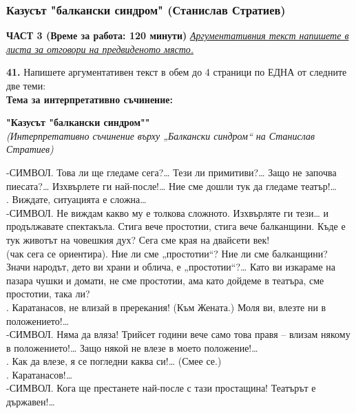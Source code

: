 \documentclass[12pt,a4paper]{article}
\begin{document}
\subsubsection{Казусът "балкански синдром" (Станислав Стратиев)}
\vspace{0.5cm}
\begin{center}
\textbf{ЧАСТ 3 (Време за работа: 120 минути)}
\vspace{0.2cm}
{\textit{\underline{Аргументативния текст напишете в листа за отговори на предвиденото място.}}}
\vspace{0.1cm}
\end{center}
\textbf{41.} Напишете аргументативен текст в обем до 4 страници по ЕДНА от следните две теми:
\\
\vspace{0.2cm}
\textbf{Тема за интерпретативно съчинение:}
\vspace{0.1cm}
\begin{center}
\textbf{"Казусът "балкански синдром""}
\\
\textit{(Интерпретативно съчинение върху „Балкански синдром“ на Станислав Стратиев)}
\end{center}
-СИМВОЛ. Това ли ще гледаме сега?… Тези ли примитиви?… Защо не започва пиесата?… Изхвърлете ги най-после!… Ние сме дошли тук да гледаме театър!…
\\
. Виждате, ситуацията е сложна…
\\
-СИМВОЛ. Не виждам какво му е толкова сложното. Изхвърляте ги тези… и продължавате спектакъла. Стига вече простотии, стига вече балканщини. Къде е тук животът на човешкия дух? Сега сме края на двайсети век!
\\
 (чак сега се ориентира). Ние ли сме „простотии“? Ние ли сме балканщини? Значи народът, дето ви храни и облича, е „простотии“?… Като ви изкараме на пазара чушки и домати, не сме простотии, ама като дойдеме в театъра, сме простотии, така ли?
\\
. Каратанасов, не влизай в пререкания! (Към Жената.) Моля ви, влезте ни в положението!…
\\
-СИМВОЛ. Няма да вляза! Трийсет години вече само това правя – влизам някому в положението!… Защо някой не влезе в моето положение!…
\\
. Как да влезе, я се погледни каква си!… (Смее се.)
\\
. Каратанасов!…
\\
-СИМВОЛ. Кога ще престанете най-после с тази простащина! Театърът е държавен!…
\end{document}
